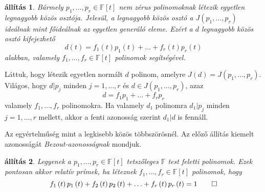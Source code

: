 \documentclass[9pt, a4paper, showtrims]{memoir}
\makeatletter
\renewenvironment{proof}[1][\proofname]
    {\par\pushQED{\qed}%
    \normalfont \topsep6\p@\@plus6\p@\relax
    \trivlist
    \item[\hskip\labelsep
        \itshape
    #1\@addpunct{:}]\ignorespaces}
    {\popQED\endtrivlist\@endpefalse}
\theoremstyle{plain}
\newtheorem{proposition}{állítás}[chapter]
\theoremstyle{remark}
\theoremstyle{definition}
\makeatother
\begin{document}
\begin{proposition}
	Bármely $p_1,\ldots,p_r\in\mathbb{F}\left[ t \right]$ nem zérus polinomoknak
	létezik egyetlen legnagyobb közös osztója.
	Jelesül,
	a legnagyobb közös osztó a $J\left( p_1,\ldots,p_r \right)$ ideálnak mint főideálnak az egyetlen generáló eleme.
	Ezért a $d$ legnagyobb közös osztó kifejezhető
	\[
		d\left( t \right)=f_1\left( t \right)p_1\left( t \right)+
		\ldots+
		f_r\left( t \right)p_r\left( t \right)
	\]
	alakban,
	valamely $f_1,\ldots,f_r\in\mathbb{F}\left[ t \right]$ polinomok segítségével.
\end{proposition}
\begin{proof}
	Láttuk, hogy létezik egyetlen normált $d$ polinom, amelyre $J\left( d \right)=J\left( p_1,\ldots,p_r \right)$.
	Világos, hogy $d|p_j$ minden $j=1,\ldots,r$ és $d\in J\left( p_1,\ldots,p_r \right)$,
	azaz
	\[
		d=f_1p_1+\ldots+f_rp_r
	\]
	valamely $f_1,\ldots,f_r$ polinomokra.
	Ha valamely $d_1$ polinomra $d_1|p_j$ minden $j=1,\ldots,r$ mellett,
	akkor a fenti azonosság szerint $d_1|d$ is fennáll.

	Az egyértelműség mint a legkisebb közös többszörösnél.
\end{proof}
Az előző állítás kiemelt azonosságát \emph{Bezout-azonosságnak}
mondjuk.
\begin{proposition}
	Legyenek a $p_1,\ldots,p_r\in\mathbb{F}\left[ t \right]$ tetszőleges $\mathbb{F}$ test feletti polinomok.
	Ezek pontosan akkor relatív prímek,
	ha léteznek $f_1,\ldots,f_r\in\mathbb{F}\left[ t \right]$ polinomok, hogy
	\[
		f_1\left( t \right)p_1\left( t \right)+f_2\left( t \right)p_2\left( t \right)+\ldots+f_r\left( t \right)p_r\left( t \right)=1\qedhere
	\]
\end{proposition}
\end{document}

